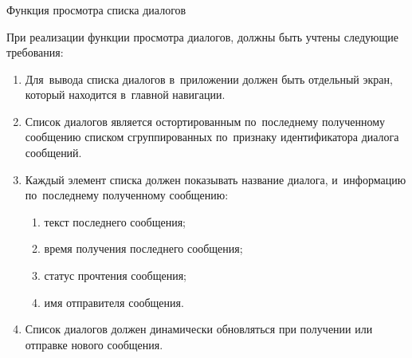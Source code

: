\subsubsection{} Функция просмотра списка диалогов
\label{sec:analysis:research:funcreq:dialogueslist}

При реализации функции просмотра диалогов, должны быть учтены следующие требования:

\begin{enumerate}
	\item Для~вывода списка диалогов в~приложении должен быть отдельный экран, который находится в~главной навигации.
	\item Список диалогов является остортированным по~последнему полученному сообщению списком сгруппированных по~признаку идентификатора диалога сообщений.
	\item Каждый элемент списка должен показывать название диалога, и~информацию по~последнему полученному сообщению:
	\begin{enumerate}
		\item текст последнего сообщения;
		\item время получения последнего сообщения;
		\item статус прочтения сообщения;
		\item имя отправителя сообщения.
	\end{enumerate}
	\item Список диалогов должен динамически обновляться при получении или отправке нового сообщения.
\end{enumerate}
